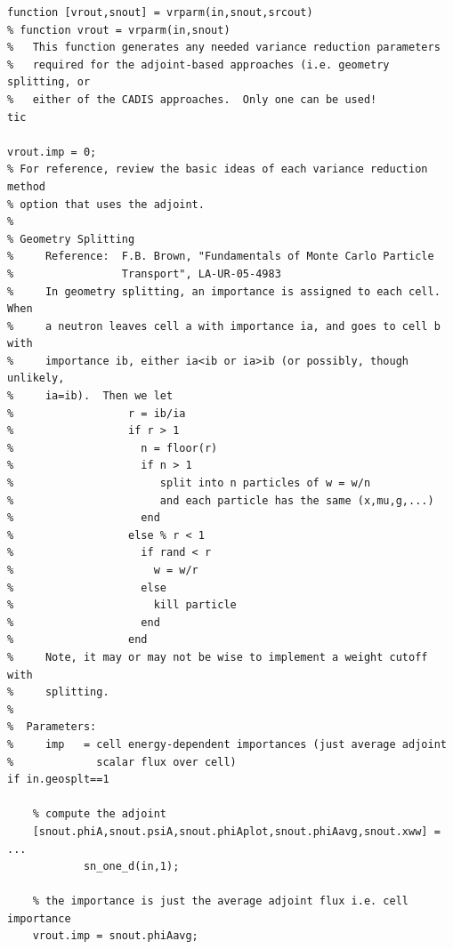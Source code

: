 \documentclass[letter,11pt]{article}
\begin{document}
{\small
\begin{verbatim}
function [vrout,snout] = vrparm(in,snout,srcout)
% function vrout = vrparm(in,snout)
%   This function generates any needed variance reduction parameters
%   required for the adjoint-based approaches (i.e. geometry splitting, or
%   either of the CADIS approaches.  Only one can be used!
tic

vrout.imp = 0;
% For reference, review the basic ideas of each variance reduction method
% option that uses the adjoint.
%
% Geometry Splitting 
%     Reference:  F.B. Brown, "Fundamentals of Monte Carlo Particle
%                 Transport", LA-UR-05-4983
%     In geometry splitting, an importance is assigned to each cell.  When
%     a neutron leaves cell a with importance ia, and goes to cell b with
%     importance ib, either ia<ib or ia>ib (or possibly, though unlikely,
%     ia=ib).  Then we let
%                  r = ib/ia   
%                  if r > 1
%                    n = floor(r)
%                    if n > 1
%                       split into n particles of w = w/n
%                       and each particle has the same (x,mu,g,...)
%                    end
%                  else % r < 1
%                    if rand < r
%                      w = w/r
%                    else
%                      kill particle
%                    end
%                  end
%     Note, it may or may not be wise to implement a weight cutoff with
%     splitting.
%
%  Parameters:
%     imp   = cell energy-dependent importances (just average adjoint
%             scalar flux over cell)
if in.geosplt==1

    % compute the adjoint
    [snout.phiA,snout.psiA,snout.phiAplot,snout.phiAavg,snout.xww] = ...
            sn_one_d(in,1);

    % the importance is just the average adjoint flux i.e. cell importance
    vrout.imp = snout.phiAavg;


\end{verbatim}}
\end{document}
